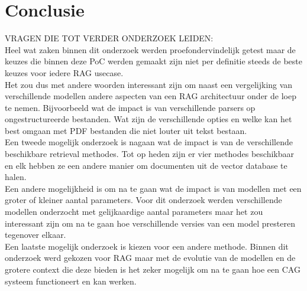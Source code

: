 
\chapter{Conclusie}%
\label{ch:conclusie}



VRAGEN DIE TOT VERDER ONDERZOEK LEIDEN:
\\[1em]

Heel wat zaken binnen dit onderzoek werden proefondervindelijk getest maar de keuzes die binnen deze PoC werden gemaakt zijn niet per definitie steeds de beste keuzes voor iedere RAG usecase. 
\\[1em]
Het zou dus met andere woorden interessant zijn om naast een vergelijking van verschillende modellen andere aspecten van een RAG architectuur onder de loep te nemen.
Bijvoorbeeld wat de impact is van verschillende parsers op ongestructureerde bestanden. Wat zijn de verschillende opties en welke kan het best omgaan met PDF bestanden die niet louter uit tekst bestaan. 
\\[1em]
Een tweede mogelijk onderzoek is nagaan wat de impact is van de verschillende beschikbare retrieval methodes. Tot op heden zijn er vier methodes beschikbaar en elk hebben ze een andere manier om documenten uit de vector database te halen.
\\[1em]
Een andere mogelijkheid is om na te gaan wat de impact is van modellen met een groter of kleiner aantal parameters. Voor dit onderzoek werden verschillende modellen onderzocht met gelijkaardige aantal parameters maar het zou interessant zijn om na te gaan hoe verschillende versies van een model presteren tegenover elkaar. 
\\[1em]
Een laatste mogelijk onderzoek is kiezen voor een andere methode. Binnen dit onderzoek werd gekozen voor RAG maar met de evolutie van de modellen en de grotere context die deze bieden is het zeker mogelijk om na te gaan hoe een CAG systeem functioneert en kan werken.

